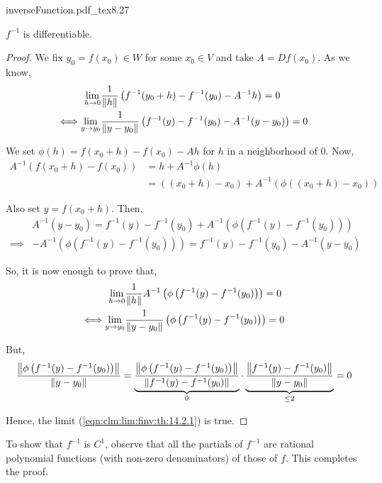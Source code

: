 \documentclass[../Analysis-3.tex]{subfiles}
\begin{document}
\begin{proofFig}{\def\svgwidth{1.4in}
    {inverseFunction.pdf_tex}}{}{\label{fig:inf:fun}}{8}{.27\textwidth}
  \begin{clmBox}
    $ f^{-1} $ is differentiable.
  \end{clmBox}

  \begin{proof}
    We fix $ y_0 = f(x_0) \in W $ for some $ x_0 \in V $ and take $ A = Df(x_0) $. As we know,
    \begin{align}
      \lim_{h \to 0}                       & \frac{1}{\norm{h}}\left( f^{-1}(y_0+h) - f^{-1}(y_0) - A^{-1}h \right)              = 0  \nonumber                  \\
      \Longleftrightarrow \lim_{y \to y_0} & \frac{1}{\norm{y-y_0}}\left( f^{-1}(y) - f^{-1}(y_0) - A^{-1}(y-y_0) \right) = 0 \label{eqn:clm:lim:finv:th:14.2.1}
    \end{align}

    We set $ \phi(h) = f(x_0+h) - f(x_0) - Ah $ for $ h $ in a neighborhood of $ 0 $. Now,
    \begin{align*}
      A^{-1}\left( f(x_0+h) - f(x_0) \right)
       & = h + A^{-1}\phi(h)                                          \\
       & = ((x_0+h) - x_0) + A^{-1}\left( \phi((x_0+h) - x_0) \right)
    \end{align*}

    Also set $ y = f(x_0+h) $. Then,
    \begin{align}
               & A^{-1}(y-y_0) = f^{-1}(y) - f^{-1}(y_0) + A^{-1}\left( \phi\left(f^{-1}(y) - f^{-1}(y_0)\right) \right)  \nonumber                                              \\
      \implies & -A^{-1}\left( \phi\left(f^{-1}(y) - f^{-1}(y_0)\right) \right) = f^{-1}(y) - f^{-1}(y_0) - A^{-1}(y-y_0)  \label{eqn:clm:limtermintermsofAinvphifinv:th:14.2.1}
    \end{align}

    So, it is now enough to prove that,
    \begin{align*}
      \lim_{h \to 0}                       & \frac{1}{\norm{h}}A^{-1}\left( \phi\left(f^{-1}(y) - f^{-1}(y_0)\right) \right)              = 0 \\
      \Longleftrightarrow \lim_{y \to y_0} & \frac{1}{\norm{y-y_0}}\left( \phi\left(f^{-1}(y) - f^{-1}(y_0)\right) \right) = 0
    \end{align*}

    But,
    \[  \frac{\norm{\phi\left(f^{-1}(y) - f^{-1}(y_0)\right)}}{\norm{y-y_0}} = \underbrace{\frac{\norm{\phi\left(f^{-1}(y) - f^{-1}(y_0)\right)}}{\norm{f^{-1}(y) - f^{-1}(y_0)}}}_{0} \cdot \underbrace{\frac{\norm{f^{-1}(y) - f^{-1}(y_0)}}{\norm{y-y_0}}}_{\leq 2} = 0  \]

    Hence, the limit (\ref{eqn:clm:lim:finv:th:14.2.1}) is true.
  \end{proof}
  To show that $ f^{-1} $ is $ C^1 $, observe that all the partials of $ f^{-1} $ are rational polynomial functions (with non-zero denominators) of those of $ f $. This completes the proof.
\end{proofFig}
\end{document}
